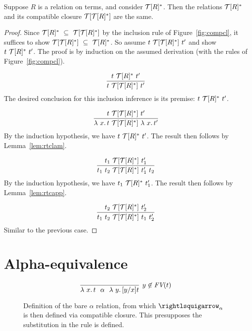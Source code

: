 \begin{lemma}
\label{lem:comprtc}
  Suppose $R$ is a relation on terms, and consider $\mathcal{T}[R]^*$.
  Then the relations $\mathcal{T}[R]^*$  and its compatible closure $\mathcal{T}[\mathcal{T}[R]^*]$ are the same.
\end{lemma}
\begin{proof}
  Since $\Tau[R]^*\ \subseteq\ \Tau[\Tau[R]^*]$ by the inclusion rule
  of Figure~\ref{fig:compcl}, it suffices to show $\mathcal{T}[\mathcal{T}[R]^*]\ \subseteq\ \mathcal{T}[R]^*$.
  So assume $t\ \mathcal{T}[\mathcal{T}[R]^*]\ t'$ and show $t\ \Tau[R]^*\ t'$.  The proof
  is by induction on the assumed derivation (with the rules of Figure~\ref{fig:compcl}).

  \case{ } 
  \[
  \infer{t\ \Tau[\Tau[R]^*]\ t'}{t\ \Tau[R]^*\ t'}
  \]
  \noindent The desired conclusion for this inclusion inference is its premise: $t\ \Tau[R]^*\ t'$.

  \case{ }
  \[
  \infer{\lam{x}{t}\ \Tau[\Tau[R]^*]\ \lam{x}{t'}}{t\ \Tau[\Tau[R]^*]\ t'}
  \]
  \noindent By the induction hypothesis, we have $t\ \Tau[R]^*\ t'$.  The result
  then follows by Lemma~\ref{lem:rtclam}. 

  \case{ }
  \[
  \infer{t_1\ t_2\ \Tau[\Tau[R]^*]\ t_1'\ t_2}{t_1\ \Tau[\Tau[R]^*]\ t_1'}
  \]
  \noindent By the induction hypothesis, we have $t_1\ \mathcal{T}[R]^*\ t_1'$.  The result
  then follows by Lemma~\ref{lem:rtcapp}. 

  \case{ }
  \[
  \infer{t_1\ t_2\ \Tau[\Tau[R]^*]\ t_1\ t_2'}{t_2\ \Tau[\Tau[R]^*]\ t_2'}
  \]
  \noindent Similar to the previous case.

  \end{proof}
        
  

\section{Alpha-equivalence}
\label{sec:alpha}

\begin{figure}
  \[
   \infer[y\not\in\textit{FV}(t)]{\lam{x}{t}\ \ \alpha\ \ \lam{y}{[y/x]t}}{\ }
  \]

  \caption{Definition of the bare $\alpha$ relation, from which $\curva_\alpha$ is then defined
    via compatible closure.  This presupposes the substitution in the rule is defined.}
\label{fig:barealpha}
\end{figure}

